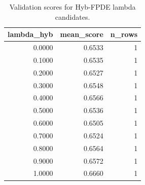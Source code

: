\begin{table}[t]
\caption{Validation scores for Hyb-FPDE lambda candidates.}
\label{tab:lambda_distribution_computed}
\centering
\begin{tabular}{rrr}
\toprule
lambda\_hyb & mean\_score & n\_rows \\
\midrule
0.0000 & 0.6533 & 1 \\
0.1000 & 0.6535 & 1 \\
0.2000 & 0.6527 & 1 \\
0.3000 & 0.6548 & 1 \\
0.4000 & 0.6566 & 1 \\
0.5000 & 0.6536 & 1 \\
0.6000 & 0.6505 & 1 \\
0.7000 & 0.6524 & 1 \\
0.8000 & 0.6564 & 1 \\
0.9000 & 0.6572 & 1 \\
1.0000 & 0.6660 & 1 \\
\bottomrule
\end{tabular}

\end{table}

